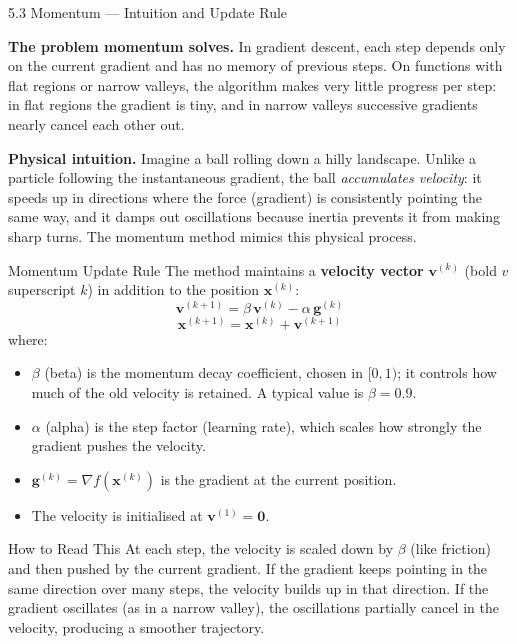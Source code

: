 \documentclass[aspectratio=169,10pt]{beamer}
\newcommand{\vx}{\mathbf{x}}
\newcommand{\vg}{\mathbf{g}}
\newcommand{\vv}{\mathbf{v}}
\begin{document}
\begin{frame}[allowframebreaks]{5.3 Momentum --- Intuition and Update Rule}

  \textbf{The problem momentum solves.}  In gradient descent,
  each step depends only on the current gradient and has no
  memory of previous steps.  On functions with flat regions
  or narrow valleys, the algorithm makes very little progress
  per step: in flat regions the gradient is tiny, and in
  narrow valleys successive gradients nearly cancel each other
  out.

  \vspace{0.5em}
  \textbf{Physical intuition.}  Imagine a ball rolling down a
  hilly landscape.  Unlike a particle following the instantaneous
  gradient, the ball \emph{accumulates velocity}: it speeds up
  in directions where the force (gradient) is consistently
  pointing the same way, and it damps out oscillations because
  inertia prevents it from making sharp turns.  The momentum
  method mimics this physical process.

  \begin{block}{Momentum Update Rule}
    The method maintains a \textbf{velocity vector}
    $\vv^{(k)}$ (bold $v$ superscript $k$) in addition to
    the position $\vx^{(k)}$:
    \[
      \vv^{(k+1)} = \beta\,\vv^{(k)} - \alpha\,\vg^{(k)}
    \]
    \[
      \vx^{(k+1)} = \vx^{(k)} + \vv^{(k+1)}
    \]
    where:
    \begin{itemize}
      \item $\beta$ (beta) is the momentum decay coefficient,
            chosen in $[0,1)$; it controls how much of the
            old velocity is retained.  A typical value is
            $\beta = 0.9$.
      \item $\alpha$ (alpha) is the step factor (learning rate),
            which scales how strongly the gradient pushes
            the velocity.
      \item $\vg^{(k)} = \nabla f(\vx^{(k)})$ is the gradient
            at the current position.
      \item The velocity is initialised at $\vv^{(1)} = \mathbf{0}$.
    \end{itemize}
  \end{block}

  \begin{alertblock}{How to Read This}
    At each step, the velocity is scaled down by $\beta$ (like
    friction) and then pushed by the current gradient.  If the
    gradient keeps pointing in the same direction over many steps,
    the velocity builds up in that direction.  If the gradient
    oscillates (as in a narrow valley), the oscillations partially
    cancel in the velocity, producing a smoother trajectory.
  \end{alertblock}


\end{frame}
\end{document}
